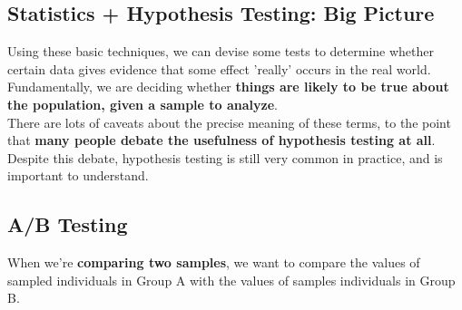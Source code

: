 \documentclass[english, 10pt]{article}
\begin{document}
{


}


\subsection{Statistics + Hypothesis Testing: Big Picture}

Using these basic techniques, we can devise some tests to determine whether certain data gives evidence that some effect 'really' occurs in the real world.\\

Fundamentally, we are deciding whether \textbf{things are likely to be true about the population, given a sample to analyze}.\\

There are lots of caveats about the precise meaning of these terms, to the point that \textbf{many people debate the usefulness of hypothesis testing at all}.\\

Despite this debate, hypothesis testing is still very common in practice, and is important to understand.

\subsection{A/B Testing}

When we're \textbf{comparing two samples}, we want to compare the values of sampled individuals in Group A with the values of samples individuals in Group B.\\
\end{document}
